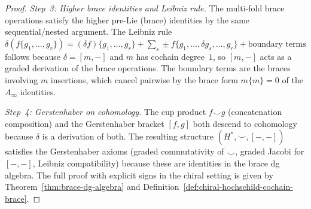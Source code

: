 \begin{proof}
\emph{Step~3: Higher brace identities and Leibniz rule.}
The multi-fold brace operations satisfy the higher pre-Lie
(brace) identities by the same sequential/nested argument. The
Leibniz rule $\delta(f\{g_1, \ldots, g_r\})
= (\delta f)\{g_1, \ldots, g_r\}
+ \sum_{s} \pm f\{g_1, \ldots, \delta g_s, \ldots, g_r\}
+ \text{boundary terms}$ follows because $\delta = [m, -]$
and $m$ has cochain degree~$1$, so $[m, -]$ acts as a
graded derivation of the brace operations. The boundary terms
are the braces involving $m$ insertions, which cancel pairwise
by the brace form $m\{m\} = 0$ of the $A_\infty$ identities.

\emph{Step~4: Gerstenhaber on cohomology.}
The cup product $f \smile g$ (concatenation composition) and the
Gerstenhaber bracket $[f, g]$ both descend to cohomology because
$\delta$ is a derivation of both. The resulting structure
$(H^*, \smile, [-,-])$ satisfies the Gerstenhaber axioms
(graded commutativity of $\smile$, graded Jacobi for $[-,-]$,
Leibniz compatibility) because these are identities in the brace
dg algebra. The full proof with explicit signs in the chiral
setting is given by Theorem~\ref{thm:brace-dg-algebra} and
Definition~\ref{def:chiral-hochschild-cochain-brace}.
\end{proof}

